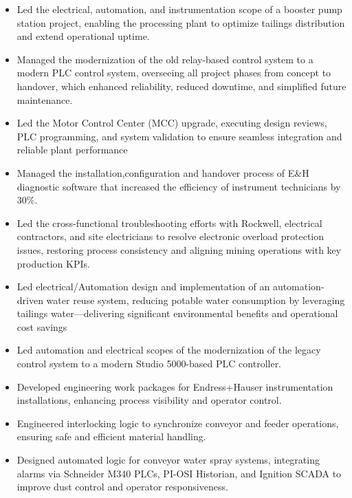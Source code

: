\documentclass[10pt,a4paper,ragged2e,withhyper]{altacv}
\begin{document}



\newpage
{}
\begin{itemize}
\item Led the electrical, automation, and instrumentation scope of a booster pump station project, enabling the processing plant to optimize tailings distribution and extend operational uptime. 
\item Managed the modernization of the old relay-based control system to a modern PLC control system, overseeing all project phases from concept to handover, which enhanced reliability, reduced downtime, and simplified future maintenance.
\item Led the Motor Control Center (MCC) upgrade, executing design reviews, PLC programming, and system validation to ensure seamless integration and reliable plant performance
\item Managed the installation,configuration and handover process of E\&H diagnostic software that increased the efficiency of instrument technicians by 30\%.
\item Led the cross-functional troubleshooting efforts with Rockwell, electrical contractors, and site electricians to resolve electronic overload protection issues, restoring process consistency and aligning mining operations with key production KPIs.
\item Led electrical/Automation design and implementation of an automation-driven water reuse system, reducing potable water consumption by leveraging tailings water—delivering significant environmental benefits and operational cost savings
\item Led automation and electrical scopes of the modernization of the legacy control system to a modern Studio 5000-based PLC controller.
\item Developed engineering work packages for Endress+Hauser instrumentation installations, enhancing process visibility and operator control.
\item Engineered interlocking logic to synchronize conveyor and feeder operations, ensuring safe and efficient material handling.
\item Designed automated logic for conveyor water spray systems, integrating alarms via Schneider M340 PLCs, PI-OSI Historian, and Ignition SCADA to improve dust control and operator responsiveness.

\end{itemize}
\end{document}
